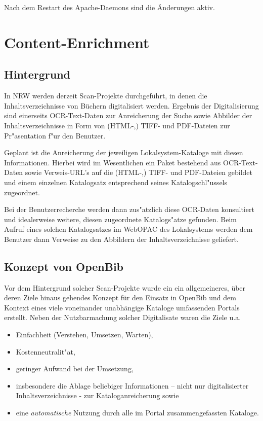 \documentclass[11pt, twoside, a4paper, BCOR8mm, DIV12, bibtotoc,idxtotoc]{scrbook}
\begin{document}
Nach dem Restart des Apache-Daemons sind die Änderungen aktiv.

\section{Content-Enrichment}

\subsection{Hintergrund}

In NRW werden derzeit Scan-Projekte durchgeführt, in denen die
Inhaltsverzeichnisse von Büchern digitalisiert werden. Ergebnis der
Digitalisierung sind einerseits OCR-Text-Daten zur Anreicherung der
Suche sowie Abbilder der Inhaltsverzeichnisse in Form von (HTML-,)
TIFF- und PDF-Dateien zur Pr"asentation f"ur den Benutzer.

Geplant ist die Anreicherung der jeweiligen Lokalsystem-Kataloge mit
diesen Informationen. Hierbei wird im Wesentlichen ein Paket bestehend
aus OCR-Text-Daten sowie Verweis-URL's auf die (HTML-,) TIFF- und
PDF-Dateien gebildet und einem einzelnen Katalogsatz entsprechend
seines Katalogschl"ussels zugeordnet.

Bei der Benutzerrecherche werden dann zus"atzlich diese OCR-Daten
konsultiert und idealerweise weitere, diesen zugeordnete Katalogs"atze
gefunden. Beim Aufruf eines solchen Katalogsatzes im WebOPAC des
Lokalsystems werden dem Benutzer dann Verweise zu den Abbildern der
Inhaltsverzeichnisse geliefert.

\subsection{Konzept von OpenBib}

Vor dem Hintergrund solcher Scan-Projekte wurde ein ein allgemeineres,
über deren Ziele hinaus gehendes Konzept für den Einsatz in OpenBib und
dem Kontext eines viele voneinander un\-ab\-hängige Kataloge umfassenden
Portals erstellt. Neben der Nutzbarmachung solcher Digitalisate waren
die Ziele u.a.

\begin{itemize}
\item Einfachheit (Verstehen, Umsetzen, Warten),
\item Kostenneutralit"at,
\item geringer Aufwand bei der Umsetzung,
\item insbesondere die Ablage beliebiger Informationen -- nicht nur
  digitalisierter Inhalts\-ver\-zeich\-nisse - zur Kataloganreicherung sowie
\item eine \emph{automatische} Nutzung durch alle im Portal
  zusammengefassten Kataloge.
\end{itemize}
\end{document}
